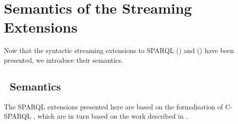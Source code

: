 \section{Semantics of the Streaming Extensions}
\label{semanticsstreaming}

Now that the syntactic streaming extensions to SPARQL (\sparqlstr) and \rtwoo (\stwoo) have been presented, we
introduce their semantics.

\subsection{\sparqlstr\ Semantics}
\label{sparqlstrsemantics}

The SPARQL extensions presented here are based on the formalisation of  C-SPARQL \cite{Barbieri_2010}, which are in turn based on the work described in \cite{Perez_09}.
%

%
%


